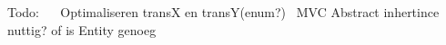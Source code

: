 Todo\+:~\newline
~\newline
 Optimaliseren transX en transY(enum?)~\newline
 M\+VC Abstract inhertince nuttig? of is Entity genoeg~\newline
 
